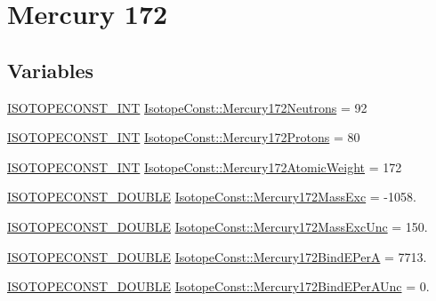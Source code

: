 \hypertarget{group___isotope_const-_mercury-_hg172}{}\section{Mercury 172}
\label{group___isotope_const-_mercury-_hg172}
\subsection*{Variables}
\begin{DoxyCompactItemize}
\item 
\mbox{\hyperlink{group___isotope_const-_macros_ga5f18360b3e99483a35c32d789e62621c}{I\+S\+O\+T\+O\+P\+E\+C\+O\+N\+S\+T\+\_\+\+I\+NT}} \mbox{\hyperlink{group___isotope_const-_mercury-_hg172_ga8f8b3aa7e2f68519b4fe99427813e88f}{Isotope\+Const\+::\+Mercury172\+Neutrons}} = 92
\item 
\mbox{\hyperlink{group___isotope_const-_macros_ga5f18360b3e99483a35c32d789e62621c}{I\+S\+O\+T\+O\+P\+E\+C\+O\+N\+S\+T\+\_\+\+I\+NT}} \mbox{\hyperlink{group___isotope_const-_mercury-_hg172_ga4b6b4258fff78660dc0b39f6cc9eee61}{Isotope\+Const\+::\+Mercury172\+Protons}} = 80
\item 
\mbox{\hyperlink{group___isotope_const-_macros_ga5f18360b3e99483a35c32d789e62621c}{I\+S\+O\+T\+O\+P\+E\+C\+O\+N\+S\+T\+\_\+\+I\+NT}} \mbox{\hyperlink{group___isotope_const-_mercury-_hg172_ga72ad2bcf0be7705e3182775f33251ef7}{Isotope\+Const\+::\+Mercury172\+Atomic\+Weight}} = 172
\item 
\mbox{\hyperlink{group___isotope_const-_macros_ga8f45a7272ce02c0b4c65c44636ed719a}{I\+S\+O\+T\+O\+P\+E\+C\+O\+N\+S\+T\+\_\+\+D\+O\+U\+B\+LE}} \mbox{\hyperlink{group___isotope_const-_mercury-_hg172_ga0237586aefe9c8e0cf9e17d1a16efc98}{Isotope\+Const\+::\+Mercury172\+Mass\+Exc}} = -\/1058.
\item 
\mbox{\hyperlink{group___isotope_const-_macros_ga8f45a7272ce02c0b4c65c44636ed719a}{I\+S\+O\+T\+O\+P\+E\+C\+O\+N\+S\+T\+\_\+\+D\+O\+U\+B\+LE}} \mbox{\hyperlink{group___isotope_const-_mercury-_hg172_gac911fdf2d5670a30c5bbdde89abc557a}{Isotope\+Const\+::\+Mercury172\+Mass\+Exc\+Unc}} = 150.
\item 
\mbox{\hyperlink{group___isotope_const-_macros_ga8f45a7272ce02c0b4c65c44636ed719a}{I\+S\+O\+T\+O\+P\+E\+C\+O\+N\+S\+T\+\_\+\+D\+O\+U\+B\+LE}} \mbox{\hyperlink{group___isotope_const-_mercury-_hg172_ga46b564d12de8c5022a01950feb5385b1}{Isotope\+Const\+::\+Mercury172\+Bind\+E\+PerA}} = 7713.
\item 
\mbox{\hyperlink{group___isotope_const-_macros_ga8f45a7272ce02c0b4c65c44636ed719a}{I\+S\+O\+T\+O\+P\+E\+C\+O\+N\+S\+T\+\_\+\+D\+O\+U\+B\+LE}} \mbox{\hyperlink{group___isotope_const-_mercury-_hg172_ga5318e7dab8499e0851fccc93a4e713fe}{Isotope\+Const\+::\+Mercury172\+Bind\+E\+Per\+A\+Unc}} = 0.

\end{DoxyCompactItemize}
